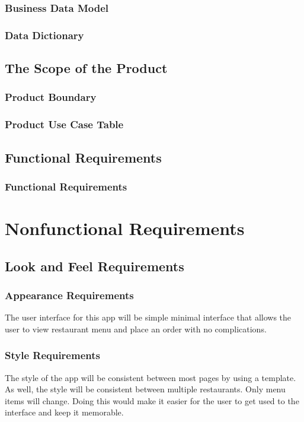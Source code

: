 \documentclass[12pt, titlepage]{article}
\begin{document}
\subsubsection{Business Data Model}
\subsubsection{Data Dictionary}
\subsection{The Scope of the Product}
\subsubsection{Product Boundary}
\subsubsection{Product Use Case Table}
\subsection{Functional Requirements}
\subsubsection{Functional Requirements}


\section{Nonfunctional Requirements}
\subsection{Look and Feel Requirements}
\subsubsection{Appearance Requirements}
The user interface for this app will be simple minimal interface that allows the user to view restaurant menu and place an order with no complications. 
\subsubsection{Style Requirements}
The style of the app will be consistent between most pages by using a template. As well, the style will be consistent between multiple restaurants. Only menu items will change. Doing this would make it easier for the user to get used to the interface and keep it memorable.
\end{document}
